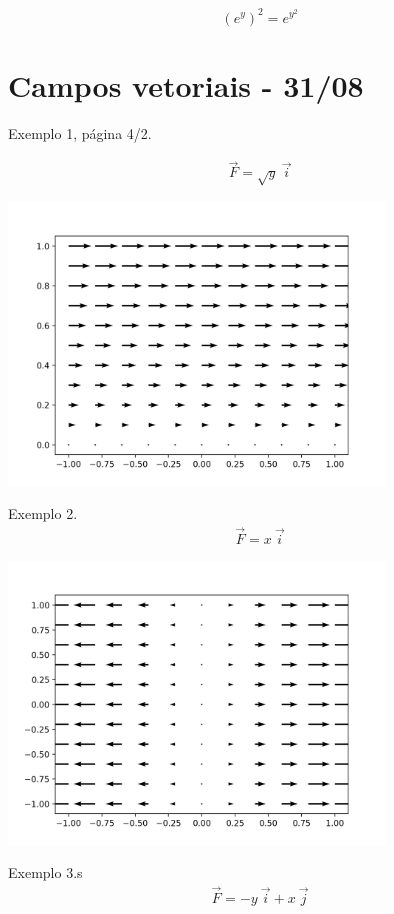 \documentclass[a4paper,10pt]{article}
\begin{document}
 $$\left(e^y\right)^2=e^{y^2}$$
 
 \section{Campos vetoriais - 31/08}
Exemplo 1, página 4/2.
 
 \begin{eqnarray*}
  \vec{F}=\sqrt{y}~\!\vec{i}
 \end{eqnarray*}

 
 \begin{center}
 \includegraphics[width=10cm]{figs/exemplo_1_4_2.png}
 \end{center}

 
 Exemplo 2.
 \begin{eqnarray*}
  \vec{F}=x~\!\vec{i}
 \end{eqnarray*}

 
 \begin{center}
 \includegraphics[width=10cm]{figs/exemplo_2_4_2.png}
 \end{center}


  Exemplo 3.s
 \begin{eqnarray*}
  \vec{F}=-y~\!\vec{i}+x~\!\vec{j}
 \end{eqnarray*}
\end{document}

